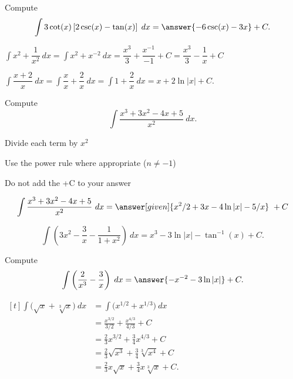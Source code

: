 \documentclass{ximera}
\begin{document}
\begin{problem}
Compute
\[
\int 3\cot(x)\left[2\csc(x) - \tan(x)\right]\; dx = \answer{-6\csc(x) - 3x} + C.
\]
\end{problem}



\begin{example} %
$\int x^2 + \dfrac{1}{x^2} \ dx = \int x^2 + x^{-2} \ dx = \dfrac{x^3}{3} + \dfrac{x^{-1}}{-1} + C 
= \dfrac{x^3}{3} - \dfrac{1}{x} + C$
\end{example}


\begin{example} %
$\int \dfrac{x+2}{x} \ dx = \int \dfrac{x}{x} + \dfrac{2}{x} \ dx = \int 1 + \dfrac{2}{x} \ dx = x + 2\ln|x| +C.$
\end{example}


\begin{problem} %
Compute
\[
\int \dfrac{x^3 + 3x^2 - 4x + 5}{x^2} \ dx.
\]

\begin{hint}
Divide each term by $x^2$
\end{hint}
\begin{hint}
Use the power rule where appropriate ($n\neq -1$)
\end{hint}
\begin{hint}
\begin{center}
Do not add the +C to your answer
\end{center}
\end{hint}

\[
\int  \dfrac{x^3 + 3x^2 - 4x + 5}{x^2} \ dx =
\answer[given]{x^2 /2 + 3x - 4\ln|x| -5/x} \ +  C
\]
\end{problem}



\begin{example} %
\[
\int \left(3x^2 - \dfrac{3}{x} - \dfrac{1}{1+x^2}\right) \ dx = x^3 - 3\ln|x| - \tan^{-1}(x) + C.
\]
\end{example}


\begin{problem}
Compute
\[
\int \left(\frac{2}{x^3} - \frac{3}{x} \right) \; dx = \answer{-x^{-2} -3\ln|x|} + C.
\]
\end{problem}

\begin{example} %
$\begin{aligned}[t]
\int \big(\sqrt x + \sqrt[3] x \big) \ dx &= \int \big(x^{1/2} + x^{1/3}\big) \ dx \\
&= \frac{x^{3/2}}{3/2} + \frac{x^{4/3}}{4/3} + C \\
&= \tfrac{2}{3} x^{3/2} + \tfrac{3}{4} x^{4/3} + C \\
&= \tfrac{2}{3} \sqrt {x^3} + \tfrac{3}{4}  \sqrt[3] {x^4} + C \\
&= \tfrac{2}{3} x\sqrt x + \tfrac{3}{4} x \sqrt[3] x + C.
\end{aligned}$
\end{example}
\end{document}
